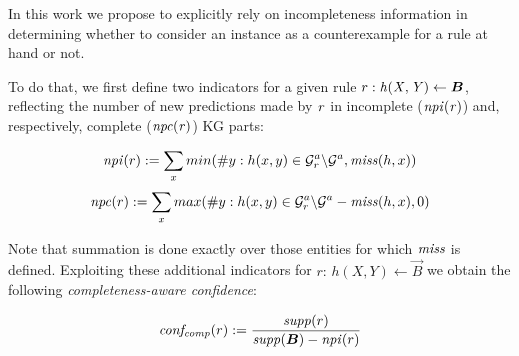 
In this work we propose to explicitly rely on incompleteness information in determining whether to consider an instance as a counterexample for a rule at hand or not.

To do that, we first define two indicators for  a given rule $r: %
\mi{h(X,Y)}\leftarrow \vec{B}$, %
reflecting the number of new 
predictions made by $\mathit{r}$ in incomplete ($\mathit{npi(r)}$) and, respectively, complete ($\mathit{npc(r)}$) KG parts:



\begin{equation}
\mathit{npi}(r) := \sum_x min(\#y: h(x,y)\in \mathcal{G}^a_r\backslash \mathcal{G}^a, \mathit{miss}(h,x))
\end{equation}
\vspace{-\topsep}
\begin{equation}
\mathit{npc}(r) := \sum_x max(\#y: h(x,y)\in\mathcal{G}^a_r\backslash \mathcal{G}^a - \mathit{miss}(h,x), 0)
\end{equation}

Note that summation is done exactly over those entities for which $\mathit{miss}$ is defined.
Exploiting these additional indicators 
for %
$r:\,h(X,Y)\leftarrow \vec{B}$ we obtain the following \emph{completeness-aware confidence}:

\begin{equation}\label{eq:comp_conf}
\mi{conf_{comp}}(r) := \frac{\mi{supp}(r)}{\mi{supp}(\vec{B}) - \mi{npi}(r)}
\end{equation}

